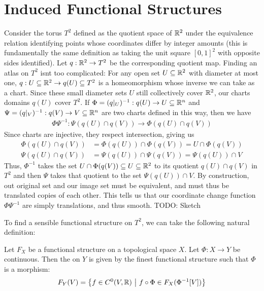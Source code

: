 \section{Induced Functional Structures}
\begin{example}
	Consider the torus $T^2$ defined as the quotient space of $\mathbb{R}^2$ under the equivalence relation identifying points whose coordinates differ by integer amounts (this is fundamentally the same definition as taking the unit square $[0,1]^2$ with opposite sides identified). Let $q : \mathbb{R}^2 \to T^2$ be the corresponding quotient map.
	\newpar
	Finding an atlas on $T^2$ isnt too complicated: For any open set $U \subseteq \mathbb{R}^2$ with diameter at most one, $q : U \subseteq \mathbb{R}^2 \to q(U) \subseteq T^2$ is a homeomorphism whose inverse we can take as a chart. Since these small diameter sets $U$ still collectively cover $\mathbb{R}^2$, our charts domains $q(U)$ cover $T^2$. 
	\newpar
	If $\Phi = (q|_U)^{-1} : q(U) \to U \subseteq \mathbb{R}^n$ and $\Psi = (q|_V)^{-1} : q(V) \to V \subseteq \mathbb{R}^n$ are two charts defined in this way, then we have
	\begin{align*}
		\Phi\Psi^{-1} : \Psi(q(U) \cap q(V)) \to \Phi(q(U) \cap q(V))
	\end{align*}
	Since charts are injective, they respect intersection, giving us
	\begin{align*}
		\Phi(q(U) \cap q(V)) &= \Phi(q(U)) \cap \Phi(q(V)) = U \cap \Phi(q(V))\\
		\Psi(q(U) \cap q(V)) &= \Psi(q(U)) \cap \Psi(q(V)) = \Psi(q(U)) \cap V
	\end{align*}
	Thus, $\Phi^{-1}$ takes the set $U \cap \Phi(q(V)) \subseteq U \subseteq \mathbb{R}^2$ to its quotient $q(U) \cap q(V)$ in $T^2$ and then $\Psi$ takes that quotient to the set $\Psi(q(U)) \cap V$. By construction, out original set and our image set must be equivalent, and must thus be translated copies of each other. This tells us that our coordinate change function $\Phi\Psi^{-1}$ are simply translations, and thus smooth.
	\newpar
	TODO: Sketch
\end{example}
To find a sensible functional structure on $T^2$, we can take the following natural definition:
\begin{definition}
	Let $F_X$ be a functional structure on a topological space $X$. Let $\Phi : X \to Y$ be continuous. Then the  on $Y$ is given by the finest functional structure such that $\Phi$ is a morphism:
	\begin{align*}
		F_Y(V) = \qty{f \in C^0(V, \mathbb{R}) ~\middle|~f \circ \Phi \in F_X(\Phi^{-1}[V])}
	\end{align*}
\end{definition}
